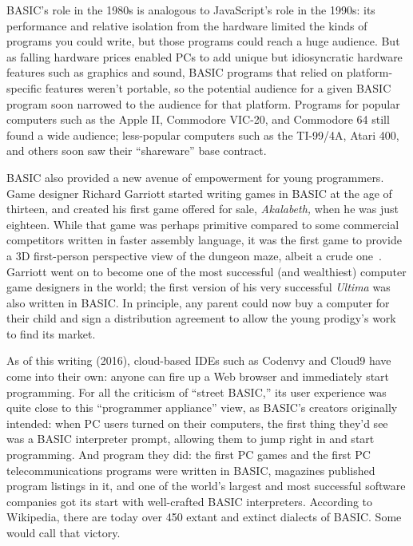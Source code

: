 BASIC's role in the 1980s is analogous to JavaScript's role in the
1990s: its performance and relative isolation from the hardware
limited
the kinds of programs you could write, but those programs could reach a
huge audience.
But as falling hardware prices enabled PCs to add unique but
idiosyncratic hardware features such as graphics and sound, BASIC
programs that relied on
platform-specific features weren't portable, so the potential audience
for a given BASIC program soon narrowed to the audience for that
platform.  Programs for popular computers such as the Apple II,
Commodore VIC-20, and Commodore 64 still found a wide audience;
less-popular computers such as the TI-99/4A, Atari 400, and others soon
saw their ``shareware'' base contract.

BASIC also provided a new avenue of empowerment for young programmers.
Game designer Richard Garriott started writing games in BASIC at the age
of thirteen, and created his first game offered for sale,
\emph{Akalabeth,} when he was just eighteen.
While that game was perhaps primitive compared to some commercial
competitors written in faster assembly language, it was the first game
to provide a 3D first-person perspective view of the dungeon maze,
albeit a crude one~\cite{akalabeth}.
Garriott went on to become one of the most successful (and
wealthiest) computer game designers in the world; the first version of
his very successful \emph{Ultima} was also written in BASIC.
In principle, any parent could now buy a computer for their child and
sign a distribution agreement to allow the young prodigy's work to
find its market.

As of this writing (2016), cloud-based IDEs such as Codenvy and Cloud9
have come into their own: anyone can fire up a Web browser and
immediately start programming.
For all the criticism of ``street BASIC,'' its user experience was quite
close to this ``programmer appliance'' view, as BASIC's creators
originally intended: when PC users turned on their computers, the first
thing they'd see was a BASIC interpreter prompt, allowing them to jump
right in and start programming.
And program they did: the first PC games and the first PC
telecommunications programs were written in BASIC, magazines published
program listings in it, and one of the world's largest and most
successful software companies got its start with well-crafted BASIC
interpreters.
According to Wikipedia, there are today over 450 extant and extinct
dialects of BASIC.
Some would call that victory.
